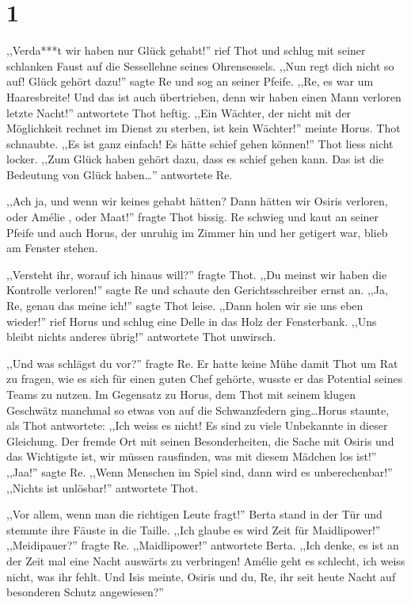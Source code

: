 \documentclass[11pt,titlepage,a5paper]{book}
\newcommand{\am}{Amélie }
\begin{document}
\section*{1}

,,Verda***t wir haben nur Glück gehabt!'' rief Thot und schlug mit seiner schlanken Faust auf die Sessellehne seines Ohrensessels. ,,Nun regt dich nicht so auf! Glück gehört dazu!'' sagte Re und sog an seiner Pfeife. ,,Re, es war um Haaresbreite! Und das ist auch übertrieben, denn wir haben einen Mann verloren letzte Nacht!'' antwortete Thot heftig. ,,Ein Wächter, der nicht mit der Möglichkeit rechnet im Dienst zu sterben, ist kein Wächter!'' meinte Horus. Thot schnaubte. ,,Es ist ganz einfach! Es hätte schief gehen können!'' Thot liess nicht locker. ,,Zum Glück haben gehört dazu, dass es schief gehen kann. Das ist die Bedeutung von Glück haben\dots '' antwortete Re.

,,Ach ja, und wenn wir keines gehabt hätten? Dann hätten wir Osiris verloren, oder \am, oder Maat!'' fragte Thot bissig. Re schwieg und kaut an seiner Pfeife und auch Horus, der unruhig im Zimmer hin und her getigert war, blieb am Fenster stehen. 

,,Versteht ihr, worauf ich hinaus will?'' fragte Thot. ,,Du meinst wir haben die Kontrolle verloren!'' sagte Re und schaute den Gerichtsschreiber ernst an. ,,Ja, Re, genau das meine ich!'' sagte Thot leise. ,,Dann holen wir sie uns eben wieder!'' rief Horus und schlug eine Delle in das Holz der Fensterbank. ,,Uns bleibt nichts anderes übrig!'' antwortete Thot unwirsch. 

,,Und was schlägst du vor?'' fragte Re. Er hatte keine Mühe damit Thot um Rat zu fragen, wie es sich für einen guten Chef gehörte, wusste er das Potential seines Teams zu nutzen. Im Gegensatz zu Horus, dem Thot mit seinem klugen Geschwätz manchmal so etwas von auf die Schwanzfedern ging\dots Horus staunte, als Thot antwortete: ,,Ich weiss es nicht! Es sind zu viele Unbekannte in dieser Gleichung. Der fremde Ort mit seinen Besonderheiten, die Sache mit Osiris und das Wichtigste ist, wir müssen rausfinden, was mit diesem Mädchen los ist!'' ,,Jaa!'' sagte Re. ,,Wenn Menschen im Spiel sind, dann wird es unberechenbar!'' ,,Nichts ist unlösbar!'' antwortete Thot.

,,Vor allem, wenn man die richtigen Leute fragt!'' Berta stand in der Tür und stemmte ihre Fäuste in die Taille. ,,Ich glaube es wird Zeit für Maidlipower!'' ,,Meidipauer?'' fragte Re. ,,Maidlipower!'' antwortete Berta. ,,Ich denke, es ist an der Zeit mal eine Nacht auswärts zu verbringen! \am geht es schlecht, ich weiss nicht, was ihr fehlt. Und Isis meinte, Osiris und du, Re, ihr seit heute Nacht auf besonderen Schutz angewiesen?''
\end{document}
